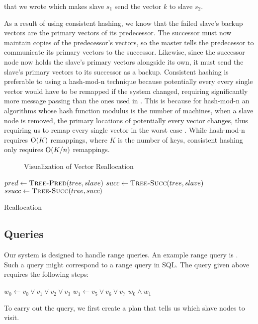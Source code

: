that we wrote which makes slave \(s_1\) send the vector \(k\) to slave \(s_2\).
\par
As a result of using consistent hashing, we know that the failed slave's backup
vectors are the primary vectors of its predecessor. The successor must now
maintain copies of the predecessor's vectors, so the master tells the
predecessor to communicate its primary vectors to the successor. Likewise,
since the successor node now holds the slave's primary vectors alongside its
own, it must send the slave's primary vectors to its successor as a backup.
Consistent hashing is preferable to using a hash-mod-n technique because
potentially every every single vector would have to be remapped if the system
changed, requiring significantly more message passing than the ones used in
. This is because for hash-mod-n an algorithms whose hash
function modulus is the number of machines, when a slave node is removed, the
primary locations of potentially every vector changes, thus requiring us to
remap every single vector in the worst case \cite{kleppman2017}. While
hash-mod-n requires \(\mathrm{O}(K)\) remappings, where \(K\) is the number of
keys, consistent hashing only requires \(\mathrm{O}(K/n)\) remappings.
\cite{karger1997}
%
\begin{figure}
    \centering
    
    \caption{Visualization of Vector Reallocation}
    \label{fig:vector-reallocation}
\end{figure}
%
\begin{algorithm}
    \begin{algorithmic}
            \State $pred \gets \Call{Tree-Pred}{tree, slave}$
            \State $succ \gets \Call{Tree-Succ}{tree, slave}$
            \State $ssucc \gets \Call{Tree-Succ}{tree, succ}$
                \State {}
            \EndFor
                \State {}
            \EndFor
            \State {}
        \EndProcedure
    \end{algorithmic}
    \caption{Reallocation}
    \label{alg:reallocate}
\end{algorithm}
%
\subsection{Queries}
Our system is designed to handle range queries. An example range query is
. Such a query might correspond to a range query in SQL.
The query given above requires the following steps:
\begin{algorithmic}
    \State $w_0 \gets v_0 \lor v_1 \lor v_2 \lor v_3$
    \State $w_1 \gets v_5 \lor v_6 \lor v_7$
    \State \Return $w_0 \land w_1$
\end{algorithmic}
To carry out the query, we first create a plan that tells us which slave nodes
to visit.
